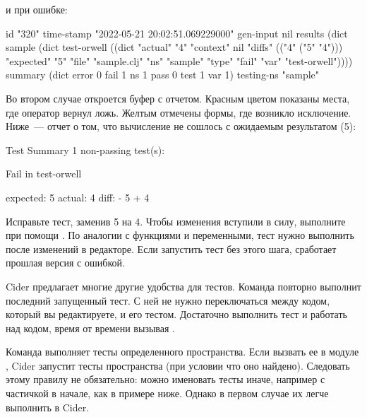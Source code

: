 \noindent
и при ошибке:

\begin{english}
  \begin{text}
  id         "320"
  time-stamp "2022-05-21 20:02:51.069229000"
  gen-input  nil
  results    (dict sample
               (dict test-orwell
                 ((dict "actual" "4"
                        "context" nil
                        "diffs" (("4" ("5" "4")))
                        "expected" "5"
                        "file" "sample.clj"
                        "ns" "sample"
                        "type" "fail"
                        "var" "test-orwell"))))
  summary    (dict error 0 fail 1
                   ns 1 pass 0 test 1 var 1)
  testing-ns "sample"
  \end{text}
\end{english}

Во втором случае откроется буфер  с отчетом. Красным цветом показаны места, где оператор  вернул ложь. Желтым отмечены формы, где возникло исключение. Ниже~--- отчет о том, что вычисление  не сошлось с ожидаемым результатом (5):

\begin{english}
  \begin{text}
Test Summary
1 non-passing test(s):

Fail in test-orwell

expected: 5
  actual: 4
    diff: - 5
          + 4
  \end{text}
\end{english}

Исправьте тест, заменив 5 на 4. Чтобы изменения вступили в силу, выполните  при помощи . По аналогии с функциями и переменными, тест нужно выполнить после изменений в редакторе. Если запустить тест без этого шага, сработает прошлая версия с ошибкой.

Cider предлагает многие другие удобства для тестов. Команда  повторно выполнит последний запущенный тест. С ней не нужно переключаться между кодом, который вы редактируете, и его тестом. Достаточно выполнить тест и работать над кодом, время от времени вызывая .

Команда  выполняет тесты определенного пространства. Если вызвать ее в модуле , Cider запустит тесты пространства  (при условии что оно найдено). Следовать этому правилу не обязательно: можно именовать тесты иначе, например с частичкой  в начале, как в примере ниже. Однако в первом случае их легче выполнить в Cider.

